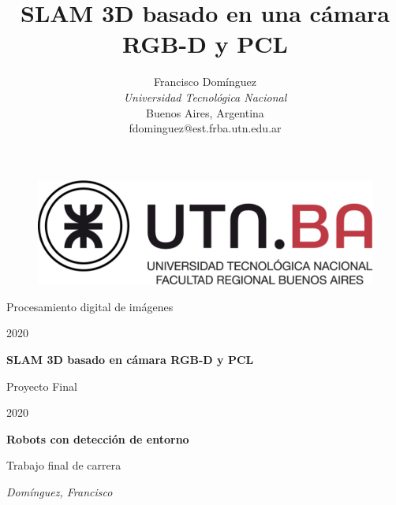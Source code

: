 \documentclass[conference]{IEEEtran}
\numberwithin{equation}{section}
\begin{document}
\ifimagenespaper
\else
    \begin{titlepage}
\fi
\ifimagenes
    \ifimagenespaper
        \title{SLAM 3D basado en una cámara RGB-D y PCL}
        
        \author{{Francisco Domínguez}\\
        {\textit{Universidad Tecnológica Nacional}\\
        Buenos Aires, Argentina \\
        fdominguez@est.frba.utn.edu.ar}
        }
        \date{}
        \maketitle
        
        
        
        
        
        
        
        
        
    \else
        \centering
        \begin{figure}[t]
        	\centering
        	\includegraphics[scale=0.15]{utn.jpg}
            \vspace{0.5cm}
        \end{figure}%
    \fi
\fi

\ifimagenes
	{\LARGE Procesamiento digital de imágenes\par}
    {\LARGE 2020\par}
	\vspace{1cm}
	{\huge\bfseries SLAM 3D basado en cámara RGB-D y PCL\par}
\else
	{\LARGE Proyecto Final\par}
    {\LARGE 2020\par}
	\vspace{1cm}
	{\huge\bfseries Robots con detección de entorno\par}
	\vspace{1cm}
    {\LARGE Trabajo final de carrera\par}
\fi
    \vspace{1cm}
	{\Large\itshape Domínguez, Francisco\par}
	\vfill
\end{titlepage}
\end{document}
